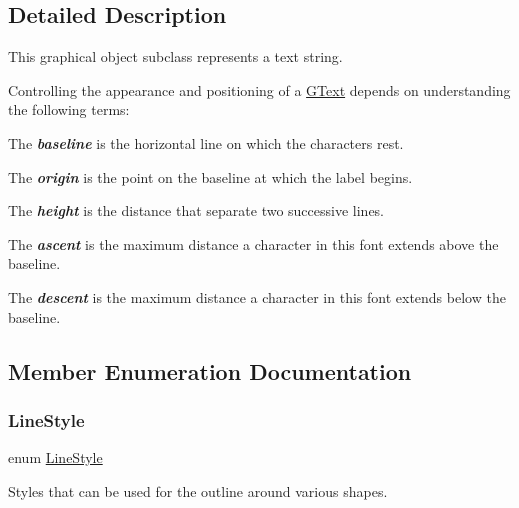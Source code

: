 \subsection{Detailed Description}
This graphical object subclass represents a text string. 

Controlling the appearance and positioning of a {\ttfamily \mbox{\hyperlink{classGText}{G\+Text}}} depends on understanding the following terms\+:


\begin{DoxyItemize}
\item The {\bfseries {\itshape baseline}} is the horizontal line on which the characters rest. 
\item The {\bfseries {\itshape origin}} is the point on the baseline at which the label begins. 
\item The {\bfseries {\itshape height}} is the distance that separate two successive lines. 
\item The {\bfseries {\itshape ascent}} is the maximum distance a character in this font extends above the baseline. 
\item The {\bfseries {\itshape descent}} is the maximum distance a character in this font extends below the baseline. 
\end{DoxyItemize}

\subsection{Member Enumeration Documentation}
\mbox{\label{classGObject_a86e0f5648542856159bb40775c854aa7}} 
\subsubsection{\texorpdfstring{Line\+Style}{LineStyle}}
{\footnotesize\ttfamily enum \mbox{\hyperlink{classGObject_a86e0f5648542856159bb40775c854aa7}{Line\+Style}}\hspace{0.3cm}{\ttfamily [inherited]}}



Styles that can be used for the outline around various shapes. 

